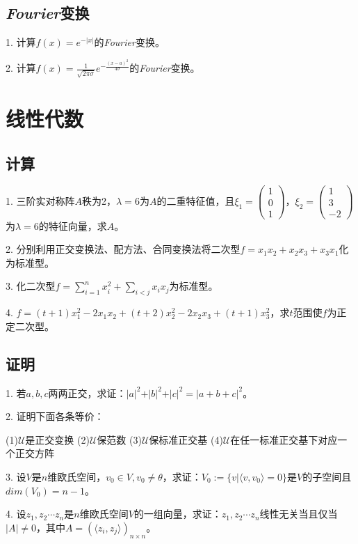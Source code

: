 \documentclass[UTF8,a4paper,12pt]{ctexart}
\begin{document}
\subsection{\emph{Fourier}变换}
1. 计算$f(x)=e^{-\vert x\vert}$的\emph{Fourier}变换。

2. 计算$f(x)=\frac{1}{\sqrt{2\pi\sigma}}e^{-\frac{(x-a)^2}{4\sigma}}$的\emph{Fourier}变换。

\section{线性代数}
\subsection{计算}
1. 三阶实对称阵$A$秩为2，$\lambda=6$为$A$的二重特征值，且$\xi_1=\begin{pmatrix} 1\\0\\1 \end{pmatrix}$，$\xi_2=\begin{pmatrix} 1\\3\\-2 \end{pmatrix}$为$\lambda=6$的特征向量，求$A$。

2. 分别利用正交变换法、配方法、合同变换法将二次型$f=x_1x_2+x_2x_3+x_3x_1$化为标准型。

3. 化二次型$f=\sum\limits_{i=1}^n x_i^2+\sum\limits_{i<j} x_ix_j$为标准型。

4. $f=(t+1)x_1^2-2x_1x_2+(t+2)x_2^2-2x_2x_3+(t+1)x_3^2$，求$t$范围使$f$为正定二次型。

\subsection{证明}
1. 若$a,b,c$两两正交，求证：$\vert a\vert^2+\vert b\vert^2+\vert c\vert^2=\vert a+b+c\vert^2$。

2. 证明下面各条等价：

(1)$\mathscr{U}$是正交变换 \quad(2)$\mathscr{U}$保范数 \quad(3)$\mathscr{U}$保标准正交基 \quad(4)$\mathscr{U}$在任一标准正交基下对应一个正交方阵

3. 设$V$是$n$维欧氏空间，$v_0\in V, v_0\neq\theta$，求证：$V_0:=\lbrace v\vert\langle v,v_0\rangle=0\rbrace$是$V$的子空间且$dim(V_0)=n-1$。

4. 设$z_1, z_2\cdots z_n$是$n$维欧氏空间$V$的一组向量，求证：$z_1, z_2\cdots z_n$线性无关当且仅当$\vert A\vert\neq 0$，其中$A=(\langle z_i,z_j\rangle)_{n\times n}$。
\end{document}
